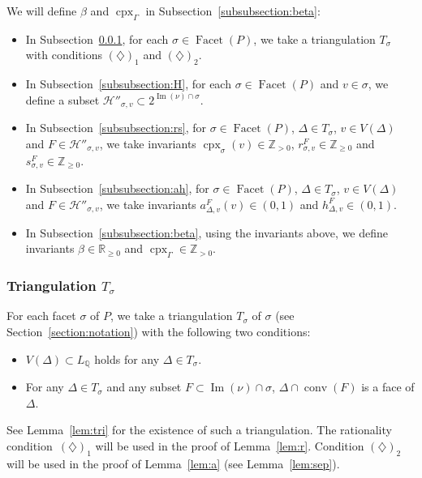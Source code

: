 We will define $\beta$ and $\operatorname{cpx}_{\Gamma}$ in Subsection~\ref{subsubsection:beta}: 
\begin{itemize}
\item 
In Subsection~\ref{subsubsection:T}, for each $\sigma \in \operatorname{Facet}(P)$, 
we take a triangulation $T_{\sigma}$  with conditions $(\diamondsuit)_1$ and $(\diamondsuit)_2$. 

\item
In Subsection~\ref{subsubsection:H}, for each $\sigma \in \operatorname{Facet}(P)$ and $v \in \sigma$, 
we define a subset $\mathcal{H}'' _{\sigma, v} \subset 2 ^{\operatorname{Im}(\nu) \cap \sigma}$.

\item 
In Subsection~\ref{subsubsection:rs}, 
for $\sigma \in \operatorname{Facet}(P)$, $\Delta \in T_{\sigma}$, $v \in V(\Delta)$ and $F \in \mathcal{H}'' _{\sigma, v}$, 
we take invariants $\operatorname{cpx}_{\sigma}(v) \in \mathbb{Z}_{>0}$, $r^{F} _{\sigma, v} \in \mathbb{Z}_{\ge 0}$ and $s^{F} _{\sigma, v} \in \mathbb{Z}_{\ge 0}$. 

\item 
In Subsection~\ref{subsubsection:ah}, 
for $\sigma \in \operatorname{Facet}(P)$, $\Delta \in T_{\sigma}$, $v \in V(\Delta)$ and $F \in \mathcal{H}'' _{\sigma, v}$, 
we take invariants $a^{F} _{\Delta, v} (v) \in (0,1)$ and $h^F_{\Delta, v} \in (0,1)$. 

\item 
In Subsection~\ref{subsubsection:beta}, using the invariants above, 
we define invariants  $\beta \in \mathbb{R}_{\ge 0}$ and $\operatorname{cpx}_{\Gamma} \in \mathbb{Z}_{> 0}$. 
\end{itemize}


\subsubsection{Triangulation $T_{\sigma}$}\label{subsubsection:T}
For each facet $\sigma$ of $P$, we take a triangulation $T_{\sigma}$ of $\sigma$ (see Section~\ref{section:notation}) with the following two conditions: 
\begin{itemize}
\item[$(\diamondsuit) _1$]
$V(\Delta) \subset L_{\mathbb{Q}}$ holds for any $\Delta \in T_{\sigma}$. 

\item[$(\diamondsuit) _2$]
For any $\Delta \in T_{\sigma}$ and any subset $F \subset \operatorname{Im}(\nu) \cap \sigma$, 
$\Delta \cap \operatorname{conv}(F)$ is a face of $\Delta$. 
\end{itemize}
See Lemma~\ref{lem:tri} for the existence of such a triangulation. 
The rationality condition~$(\diamondsuit) _1$ will be used in the proof of Lemma~\ref{lem:r}. 
Condition $(\diamondsuit) _2$ will be used in the proof of Lemma~\ref{lem:a} (see Lemma~\ref{lem:sep}). 

